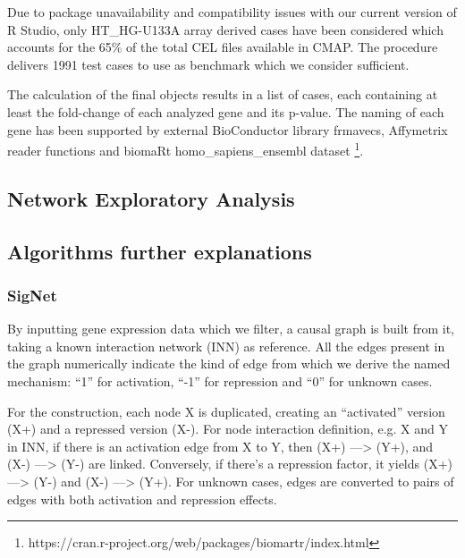 Due to package unavailability and compatibility issues with our current version of R Studio, only HT\_HG-U133A array derived cases have been considered which accounts for the 65\% of the total CEL files available in CMAP. The procedure delivers 1991 test cases to use as benchmark which we consider sufficient.

The calculation of the final objects results in a list of cases, each containing at least the fold-change of each analyzed gene and its p-value. The naming of each gene has been supported by external BioConductor library frmavecs, Affymetrix reader functions and biomaRt homo\_sapiens\_ensembl dataset \footnote{https://cran.r-project.org/web/packages/biomartr/index.html}.
\label{section:suppl:bench}

\subsection{Network Exploratory Analysis}
\label{section:suppl:eda}

\subsection{Algorithms further explanations}
\label{section:suppl:algorithms}

\subsubsection{SigNet}
\label{section:suppl:algorithms-signet}
By inputting gene expression data which we filter, a causal graph is built from it, taking a known interaction network (INN) as reference. All the edges present in the graph numerically indicate the kind of edge from which we derive the named mechanism: “1” for activation, “-1” for repression and “0” for unknown cases.

For the construction, each node X is duplicated, creating an “activated” version (X+) and a repressed version (X-). For node interaction definition, e.g. X and Y in INN, if there is an activation edge from X to Y, then (X+) —> (Y+), and (X-) —> (Y-) are linked. Conversely, if there’s a repression factor, it yields (X+) —> (Y-) and (X-) —> (Y+). For unknown cases, edges are converted to pairs of edges with both activation and repression effects.